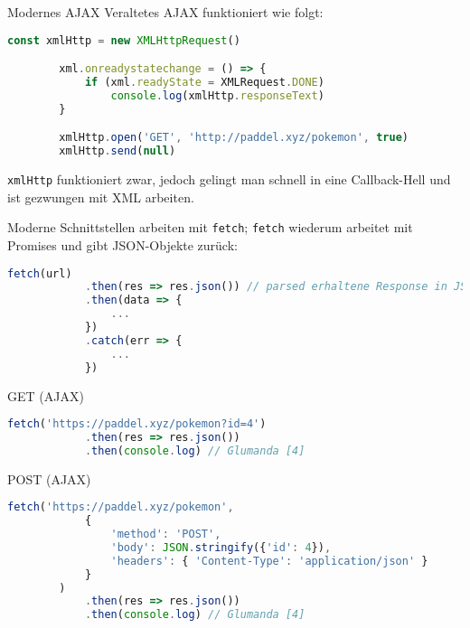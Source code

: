 \begin{bonus}{Modernes AJAX}
    Veraltetes AJAX funktioniert wie folgt:
    \begin{lstlisting}[language=JavaScript]
        const xmlHttp = new XMLHttpRequest()

        xml.onreadystatechange = () => {
            if (xml.readyState = XMLRequest.DONE)
                console.log(xmlHttp.responseText)
        }

        xmlHttp.open('GET', 'http://paddel.xyz/pokemon', true)
        xmlHttp.send(null)
    \end{lstlisting}

    \texttt{xmlHttp} funktioniert zwar, jedoch gelingt man schnell in eine Callback-Hell und ist gezwungen mit XML arbeiten.

    Moderne Schnittstellen arbeiten mit \texttt{fetch}; \texttt{fetch} wiederum arbeitet mit Promises und gibt JSON-Objekte zurück:
    \begin{lstlisting}[language=JavaScript]
        fetch(url)
            .then(res => res.json()) // parsed erhaltene Response in JSON
            .then(data => {
                ...
            })
            .catch(err => {
                ...
            })
    \end{lstlisting}
\end{bonus}

\begin{example}{GET (AJAX)}
    \begin{lstlisting}[language=JavaScript]
        fetch('https://paddel.xyz/pokemon?id=4')
            .then(res => res.json())
            .then(console.log) // Glumanda [4]
    \end{lstlisting}
\end{example}

\begin{example}{POST (AJAX)}
    \begin{lstlisting}[language=JavaScript]
        fetch('https://paddel.xyz/pokemon',
            {
                'method': 'POST',
                'body': JSON.stringify({'id': 4}),
                'headers': { 'Content-Type': 'application/json' }
            }
        )
            .then(res => res.json())
            .then(console.log) // Glumanda [4]
    \end{lstlisting}
\end{example}